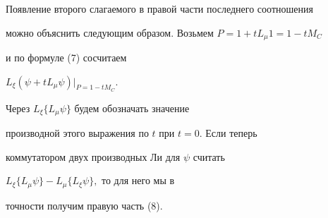 Появление второго слагаемого в правой части последнего соотношения


можно объяснить следующим образом. Возьмем $P=1+tL_\mu 1=1-tM_C$


и по формуле (7) сосчитаем


$L_\xi (\psi+tL_\mu \psi)\vert_{P=1-tM_C}$.


Через $L_\xi\{L_\mu\psi\}$ будем обозначать значение


производной этого выражения по $t$ при $t=0.$ Если теперь


коммутатором двух производных Ли для $\psi$ считать


$L_\xi\{L_\mu\psi\}-L_\mu\{L_\xi\psi\},$ то для него мы в


точности получим правую часть (8).








